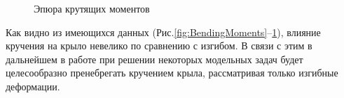 %

\begin{figure}[H]
\centering
\def\svgwidth{0.9\textwidth}

\caption{Эпюра крутящих моментов}
\label{fig:RotatingMoments}
\end{figure}


Как видно из имеющихся данных (Рис.\ref{fig:BendingMoments}--\ref{fig:RotatingMoments}), влияние кручения на крыло невелико по сравнению с изгибом. В связи с этим в дальнейшем в работе при решении некоторых модельных задач будет целесообразно пренебрегать кручением крыла, рассматривая только изгибные деформации. 

